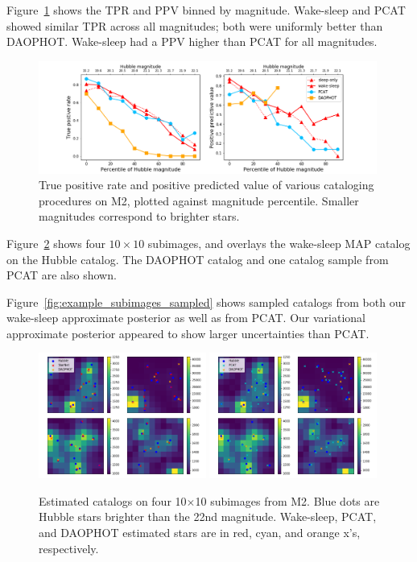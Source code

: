 Figure~\ref{fig:summary_stats} shows the TPR and PPV binned by magnitude.
Wake-sleep and PCAT showed similar TPR across all magnitudes; both were
uniformly better than DAOPHOT. Wake-sleep had a PPV higher than PCAT for all magnitudes. 
\begin{figure}[ht]
    \centering
    \includegraphics[width=0.99\textwidth]{figures/summary_statistics_m2.png}
    \caption{True positive rate and positive predicted value of various cataloging
    procedures on M2, plotted against magnitude percentile.
    Smaller magnitudes correspond to brighter stars. }
    \label{fig:summary_stats}
\end{figure}


Figure~\ref{fig:example_subimages} shows four $10\times10$ subimages, and overlays the wake-sleep MAP catalog on the Hubble catalog. The DAOPHOT catalog and one catalog sample from PCAT are also shown. 

Figure~\ref{fig:example_subimages_sampled} shows sampled catalogs from both our wake-sleep approximate posterior as well as from PCAT.
Our variational approximate posterior appeared to show larger uncertainties
than PCAT. 
\newpage

\begin{figure}[H]
    \centering
    \includegraphics[width=0.49\textwidth]{figures/example_subimages_ws.png}
    \includegraphics[width=0.49\textwidth]{figures/example_subimages_pcat.png}
    \caption{Estimated catalogs on four 10$\times$10 subimages from
    M2. Blue dots are Hubble stars brighter than the 22nd magnitude.
    Wake-sleep, PCAT, and DAOPHOT estimated stars are in
    red, cyan, and orange x's, respectively. }
    \label{fig:example_subimages}
\end{figure}
\newpage


